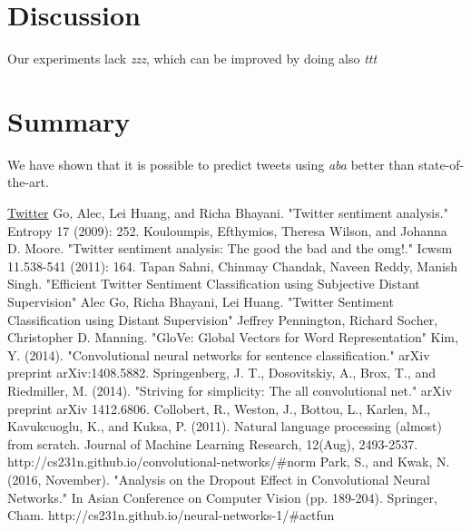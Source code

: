 \documentclass[10pt,conference,compsocconf]{IEEEtran}
\begin{document}
\section{Discussion}
Our experiments lack {\em zzz}, which can be improved by doing also {\em ttt}
\section{Summary}
We have shown that it is possible to predict tweets using {\em aba} better than state-of-the-art.



\begin{thebibliography}{99}

	 \href{http://twitter.com}{Twitter}
	 Go, Alec, Lei Huang, and Richa Bhayani. "Twitter sentiment analysis." Entropy 17 (2009): 252.
	 Kouloumpis, Efthymios, Theresa Wilson, and Johanna D. Moore. "Twitter sentiment analysis: The good the bad and the omg!." Icwsm 11.538-541 (2011): 164.
	 Tapan Sahni, Chinmay Chandak, Naveen Reddy, Manish Singh. "Efficient Twitter Sentiment Classification using Subjective Distant Supervision"
	 Alec Go, Richa Bhayani,	Lei Huang. "Twitter Sentiment Classification using Distant Supervision"
	 Jeffrey Pennington, Richard Socher, Christopher D. Manning. "GloVe: Global Vectors for Word Representation"
	  Kim, Y. (2014). "Convolutional neural networks for sentence classification." arXiv preprint arXiv:1408.5882.
	 Springenberg, J. T., Dosovitskiy, A., Brox, T., and Riedmiller, M. (2014). "Striving for simplicity: The all convolutional net." arXiv preprint arXiv 1412.6806.
	 Collobert, R., Weston, J., Bottou, L., Karlen, M., Kavukcuoglu, K., and Kuksa, P. (2011). Natural language processing (almost) from scratch. Journal of Machine Learning Research, 12(Aug), 2493-2537.
	 http://cs231n.github.io/convolutional-networks/{\#}norm
	 Park, S., and Kwak, N. (2016, November). "Analysis on the Dropout Effect in Convolutional Neural Networks." In Asian Conference on Computer Vision (pp. 189-204). Springer, Cham.
	 http://cs231n.github.io/neural-networks-1/{\#}actfun
\end{thebibliography}
\end{document}
